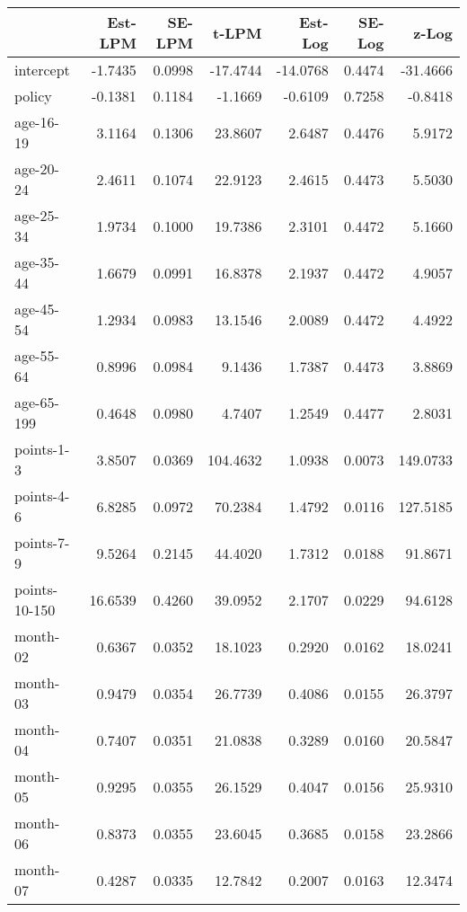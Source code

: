 \documentclass[10pt]{article}
\begin{document}
\clearpage
\pagebreak




\begin{table}[ht]
\centering
\begin{tabular}{lrrrrrr}
  \hline
 & Est-LPM & SE-LPM & t-LPM & Est-Log & SE-Log & z-Log \\ 
  \hline
intercept & -1.7435 & 0.0998 & -17.4744 & -14.0768 & 0.4474 & -31.4666 \\ 
  policy & -0.1381 & 0.1184 & -1.1669 & -0.6109 & 0.7258 & -0.8418 \\ 
  age-16-19 & 3.1164 & 0.1306 & 23.8607 & 2.6487 & 0.4476 & 5.9172 \\ 
  age-20-24 & 2.4611 & 0.1074 & 22.9123 & 2.4615 & 0.4473 & 5.5030 \\ 
  age-25-34 & 1.9734 & 0.1000 & 19.7386 & 2.3101 & 0.4472 & 5.1660 \\ 
  age-35-44 & 1.6679 & 0.0991 & 16.8378 & 2.1937 & 0.4472 & 4.9057 \\ 
  age-45-54 & 1.2934 & 0.0983 & 13.1546 & 2.0089 & 0.4472 & 4.4922 \\ 
  age-55-64 & 0.8996 & 0.0984 & 9.1436 & 1.7387 & 0.4473 & 3.8869 \\ 
  age-65-199 & 0.4648 & 0.0980 & 4.7407 & 1.2549 & 0.4477 & 2.8031 \\ 
  points-1-3 & 3.8507 & 0.0369 & 104.4632 & 1.0938 & 0.0073 & 149.0733 \\ 
  points-4-6 & 6.8285 & 0.0972 & 70.2384 & 1.4792 & 0.0116 & 127.5185 \\ 
  points-7-9 & 9.5264 & 0.2145 & 44.4020 & 1.7312 & 0.0188 & 91.8671 \\ 
  points-10-150 & 16.6539 & 0.4260 & 39.0952 & 2.1707 & 0.0229 & 94.6128 \\ 
  month-02 & 0.6367 & 0.0352 & 18.1023 & 0.2920 & 0.0162 & 18.0241 \\ 
  month-03 & 0.9479 & 0.0354 & 26.7739 & 0.4086 & 0.0155 & 26.3797 \\ 
  month-04 & 0.7407 & 0.0351 & 21.0838 & 0.3289 & 0.0160 & 20.5847 \\ 
  month-05 & 0.9295 & 0.0355 & 26.1529 & 0.4047 & 0.0156 & 25.9310 \\ 
  month-06 & 0.8373 & 0.0355 & 23.6045 & 0.3685 & 0.0158 & 23.2866 \\ 
  month-07 & 0.4287 & 0.0335 & 12.7842 & 0.2007 & 0.0163 & 12.3474 \\ 

\end{tabular}
\end{table}
\end{document}
